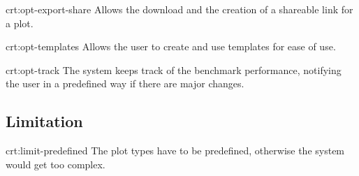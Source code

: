 {crt:opt-export-share}
{Allows the download and the creation of a shareable link for a \gls{plot}.}

{crt:opt-templates}
{Allows the \gls{user} to create and use \glspl{template} for ease of use.}

{crt:opt-track}
{The system keeps track of the benchmark performance, notifying the \gls{user} in a predefined way if there are major changes.}


\subsection{Limitation}

{crt:limit-predefined}
{The \gls{plot} types have to be predefined, otherwise the system would get too complex.}

